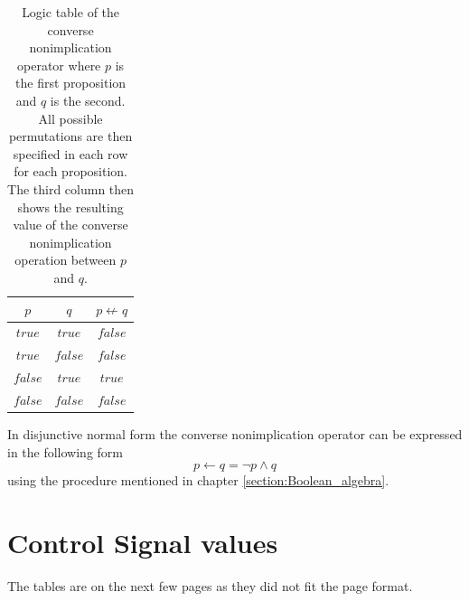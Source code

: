         \begin{table}[h!]
            \centering
            \begin{tabular}{|c|c|c|}
            	\hline
            	  $p$   &   $q$   & $p \not\leftarrow q$ \\ \hline
            	$true$  & $true$  &       $false$        \\ \hline
            	$true$  & $false$ &       $false$        \\ \hline
            	$false$ & $true$  &        $true$        \\ \hline
            	$false$ & $false$ &       $false$        \\ \hline
            \end{tabular}
            \caption{Logic table of the converse nonimplication operator where $p$ is the first proposition and $q$ is the second. All possible permutations are then specified in each row for each proposition. The third column then shows the resulting value of the converse nonimplication operation between $p$ and $q$.}
            \label{LogicTable:CNI}
        \end{table}
        
        In disjunctive normal form the converse nonimplication operator can be expressed in the following form
        \begin{equation}
            p \leftarrow q =\neg p \wedge q
        \end{equation}
        using the procedure mentioned in chapter \ref{section:Boolean_algebra}.
        
        
\chapter{Control Signal values}
\label{appendix:Controlsignalvalues}
    The tables are on the next few pages as they did not fit the page format.


